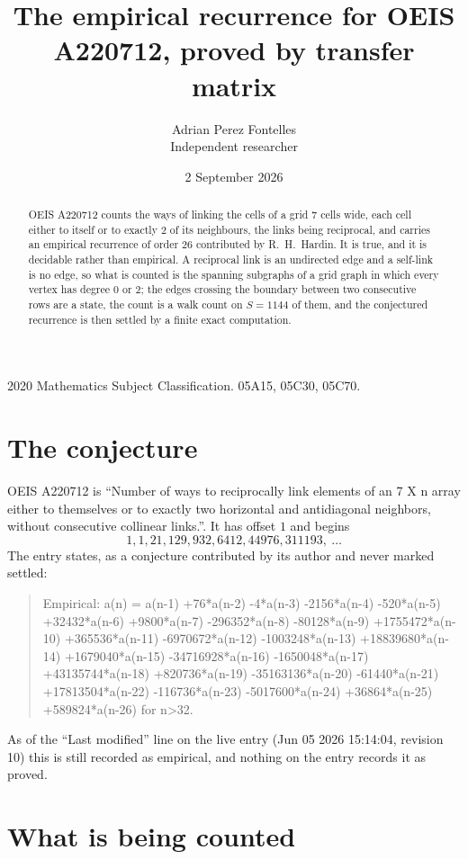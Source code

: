 \documentclass[11pt,a4paper]{article}
\title{The empirical recurrence for OEIS A220712, proved by transfer matrix}
\author{Adrian Perez Fontelles\\ \small Independent researcher}
\date{2 September 2026}
\theoremstyle{plain}
\theoremstyle{definition}
\begin{document}
\maketitle

\begin{abstract}
OEIS A220712 counts the ways of linking the cells of a grid $7$ cells wide, each cell either to
itself or to exactly $2$ of its neighbours, the links being reciprocal, and carries an
empirical recurrence of order $26$ contributed by R.~H.~Hardin. It is true, and it is
decidable rather than empirical. A reciprocal link is an undirected edge and a self-link is
no edge, so what is counted is the spanning subgraphs of a grid graph in which every vertex
has degree $0$ or $2$; the edges crossing the boundary between two consecutive rows are a
state, the count is a walk count on $S=1144$ of them, and the conjectured recurrence is then
settled by a finite exact computation.
\end{abstract}

\noindent\small 2020 Mathematics Subject Classification. 05A15, 05C30, 05C70.\normalsize

\section{The conjecture}

OEIS A220712 is ``Number of ways to reciprocally link elements of an 7 X n array either to themselves or to exactly two horizontal and antidiagonal neighbors, without consecutive collinear links.''. It has offset $1$ and begins
\[
1, 1, 21, 129, 932, 6412, 44976, 311193,\ \dots
\]
The entry states, as a conjecture contributed by its author and never marked settled:
\begin{quote}
Empirical: a(n) = a(n-1) +76*a(n-2) -4*a(n-3) -2156*a(n-4) -520*a(n-5) +32432*a(n-6) +9800*a(n-7) -296352*a(n-8) -80128*a(n-9) +1755472*a(n-10) +365536*a(n-11) -6970672*a(n-12) -1003248*a(n-13) +18839680*a(n-14) +1679040*a(n-15) -34716928*a(n-16) -1650048*a(n-17) +43135744*a(n-18) +820736*a(n-19) -35163136*a(n-20) -61440*a(n-21) +17813504*a(n-22) -116736*a(n-23) -5017600*a(n-24) +36864*a(n-25) +589824*a(n-26) for n>32.
\end{quote}
As of the ``Last modified'' line on the live entry (Jun 05 2026 15:14:04, revision 10) this is still
recorded as empirical, and nothing on the entry records it as proved.

\section{What is being counted}
\end{document}
